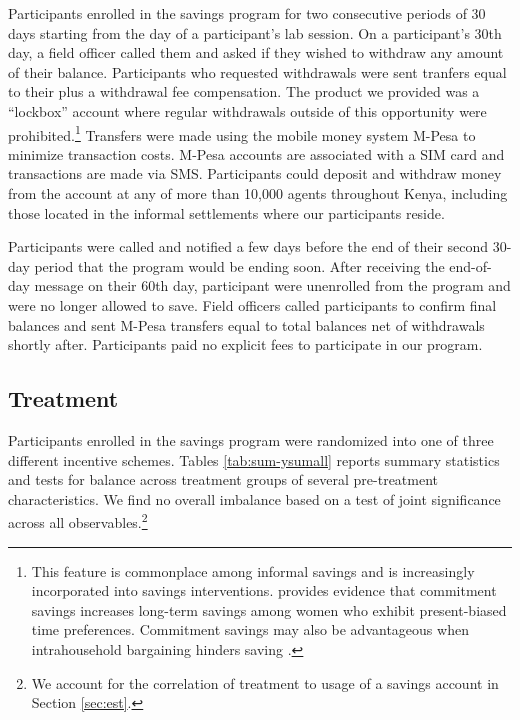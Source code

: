 \documentclass[11pt]{article}
\begin{document}
		Participants enrolled in the savings program for two consecutive periods of 30 days starting from the day of a participant's lab session. On a participant's 30th day, a field officer called them and asked if they wished to withdraw any amount of their balance. Participants who requested withdrawals were sent tranfers equal to their plus a withdrawal fee compensation. The product we provided was a ``lockbox'' account where regular withdrawals outside of this opportunity were prohibited.\footnote{This feature is commonplace among informal savings and is increasingly incorporated into savings interventions. \textcite{ashraf_tying_2006} provides evidence that commitment savings increases long-term savings among women who exhibit present-biased time preferences. Commitment savings may also be advantageous when intrahousehold bargaining hinders saving \parencite{banerjee_economic_2007,schaner_cost_2011}.} Transfers were made using the mobile money system M-Pesa to minimize transaction costs. M-Pesa accounts are associated with a SIM card and transactions are made via SMS. Participants could deposit and withdraw money from the account at any of more than 10,000 agents throughout Kenya, including those located in the informal settlements where our participants reside.

		Participants were called and notified a few days before the end of their second 30-day period that the program would be ending soon. After receiving the end-of-day message on their 60th day, participant were unenrolled from the program and were no longer allowed to save. Field officers called participants to confirm final balances and sent M-Pesa transfers equal to total balances net of withdrawals shortly after. Participants paid no explicit fees to participate in our program.

	\subsection{Treatment} \label{sec:treat}

		Participants enrolled in the savings program were randomized into one of three different incentive schemes. Tables \ref{tab:sum-ysumall} reports summary statistics and tests for balance across treatment groups of several pre-treatment characteristics. We find no overall imbalance based on a test of joint significance across all observables.\footnote{We account for the correlation of treatment to usage of a savings account in Section \ref{sec:est}.}
\end{document}
